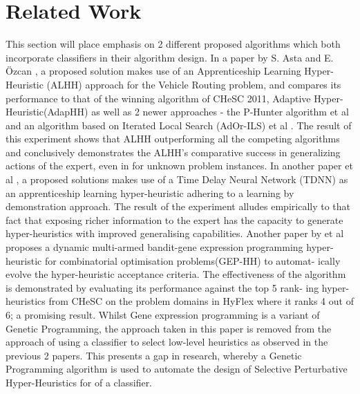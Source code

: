 \documentclass[a4paper,12pt]{article}
\begin{document}
\section{Related Work}  \label{sec:relwork}
    \par{
        This section will place emphasis on 2 different proposed algorithms 
        which both incorporate classifiers in their algorithm design.\newline 
        \newline 
        In a paper by S. Asta and E. Özcan \cite{astaozcan}, a proposed solution 
        makes use of an Apprenticeship Learning Hyper-Heuristic (ALHH) approach 
        for the Vehicle Routing problem, and compares its performance to that of 
        the winning algorithm of CHeSC 2011, Adaptive Hyper-Heuristic(AdapHH) as well 
        as 2 newer approaches - the P-Hunter algorithm et al   and an algorithm 
        based on Iterated Local Search (AdOr-ILS) et al \cite{ILS} . The result of 
        this experiment shows that ALHH outperforming all the competing algorithms and 
        conclusively demonstrates the ALHH’s comparative success in generalizing actions of 
        the expert, even in for unknown problem instances.\newline 
        \newline 
        In another paper et al \cite{tdnn} , a proposed solutions makes use of a Time Delay Neural
        Network (TDNN) as an apprenticeship learning hyper-heuristic adhering
        to a learning by demonstration approach. The result of the experiment alludes
        empirically to that fact that exposing richer information to the expert has the
        capacity to generate hyper-heuristics with improved generalising capabilities.
        Another paper by et al \cite{gehh} proposes a dynamic multi-armed bandit-gene expression programming
        hyper-heuristic for combinatorial optimisation problems(GEP-HH) to automat-
        ically evolve the hyper-heuristic acceptance criteria. The effectiveness of the
        algorithm is demonstrated by evaluating its performance against the top 5 rank-
        ing hyper-heuristics from CHeSC on the problem domains in HyFlex where it
        ranks 4 out of 6; a promising result.\newline 
        \newline 
        Whilst Gene expression programming is a variant of Genetic Programming, the
        approach taken in this paper is removed from the approach of using a classifier to
        select low-level heuristics as observed in the previous 2 papers. This presents a
        gap in research, whereby a Genetic Programming algorithm is used to automate
        the design of Selective Perturbative Hyper-Heuristics for of a classifier.
    }
\end{document}
